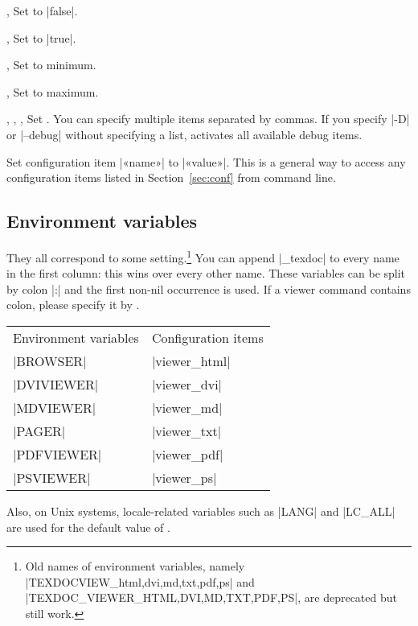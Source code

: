 \documentclass[draft]{texdoc-doc}
\begin{document}
\begin{clopt}{, }
Set  to |false|.
\end{clopt}

\begin{clopt}{, }
Set  to |true|.
\end{clopt}

\begin{clopt}{, }
Set  to minimum.
\end{clopt}

\begin{clopt}{, }
Set  to maximum.
\end{clopt}

\begin{clopt}{%
  , ,
  , }
Set . You can specify multiple items separated by commas. If
you specify |-D| or |--debug| without specifying a list, activates all
available debug items.
\end{clopt}

\begin{clopt}{}
Set configuration item |«name»| to |«value»|. This is a general way to access
any configuration items listed in Section~\ref{sec:conf} from command line.
\end{clopt}

\subsection{Environment variables}
\label{sec:envvar}

They all correspond to some  setting.\footnote{Old names
of environment variables, namely |TEXDOCVIEW_{html,dvi,md,txt,pdf,ps}| and
|TEXDOC_VIEWER_{HTML,DVI,MD,TXT,PDF,PS}|, are deprecated but still work.} You
can append |_texdoc| to every name in the first column: this wins over every
other name. These variables can be split by colon |:| and the first non-nil
occurrence is used. If a viewer command contains colon, please specify it by
.
%
\begin{center}
\begin{tabular}{ll}
Environment variables & Configuration items \\
|BROWSER|             & |viewer_html|       \\
|DVIVIEWER|           & |viewer_dvi|        \\
|MDVIEWER|            & |viewer_md|         \\
|PAGER|               & |viewer_txt|        \\
|PDFVIEWER|           & |viewer_pdf|        \\
|PSVIEWER|            & |viewer_ps|         \\
\end{tabular}
\end{center}
%
Also, on Unix systems, locale-related variables such as |LANG| and |LC_ALL|
are used for the default value of .
\end{document}
